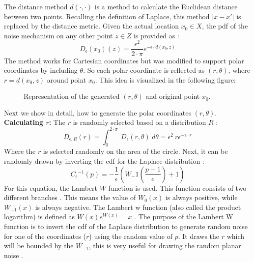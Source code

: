 The distance method $d(\cdot, \cdot)$ is a method to calculate the Euclidean distance between two points.
Recalling the definition of Laplace, this method $|x-x'|$ is replaced by the distance metric.
Given the actual location $x_0 \in X$, the \gls{pdf} of the noise mechanism on any other point $z \in Z$ is provided as \citep{DBLP:journals/corr/abs-1212-1984}: 
\begin{equation}
  D_\epsilon(x_0)(z) = \frac{\epsilon^2}{2 \cdot \pi}e^{-\epsilon \cdot d(x_0, z)}
  \label{eq:polar-laplace-pdf}
\end{equation}
The method works for Cartesian coordinates but was modified to support polar coordinates by including $\theta$.
So each polar coordinate is reflected as $(r, \theta)$, where $r = d(x_0, z)$ around point $x_0$.
This idea is visualized in the following figure:
\begin{figure}[H]
  
  \centering
  \caption{Representation of the generated $(r,\theta)$ and original point $x_0$.}
  \label{figure:parea}
\end{figure}
Next we show in detail, how to generate the polar coordinates $(r, \theta)$. \newline
\textbf{Calculating $r$:}
The $r$ is randomly selected based on a distribution $R$ \citep{DBLP:journals/corr/abs-1212-1984}: 
\begin{equation}
    D_{\epsilon, R}(r) = \int^{2\cdot \pi}_0 \ D_\epsilon(r, \theta) \ d\theta = \epsilon^2 \ r \epsilon^{-\epsilon \cdot r}
    \label{2d:generate-r}
\end{equation}
Where the $r$ is selected randomly on the area of the circle. 
Next, it can be randomly drawn by inverting the \gls{cdf} for the Laplace distribution \citep{DBLP:journals/corr/abs-1212-1984}:
\begin{equation}
  C{_\epsilon}{^{-1}}(p) = - \frac{1}{\epsilon}(W_-1 (\frac{p - 1}{e}) + 1)
  \label{eq:lambert_w_1}
\end{equation}
For this equation, the Lambert $W$ function is used. This function consists of two different branches \citep{corless_lambertw_1996}. This means the value of $W_0(x)$ is always positive, while $W_{-1}(x)$ is always negative. The Lambert w function (also called the product logarithm) is defined as $W(x)e^{W(x)} = x$ \citep{lehtonen_lambert_2016}.
The purpose of the Lambert W function is to invert the \gls{cdf} of the Laplace distribution to generate random noise for one of the coordinates ($r$) using the random value of $p$. It draws the $r$ which will be bounded by the $W_{-1}$, this is very useful for drawing the random planar noise \citep{corless_lambertw_1996}.

